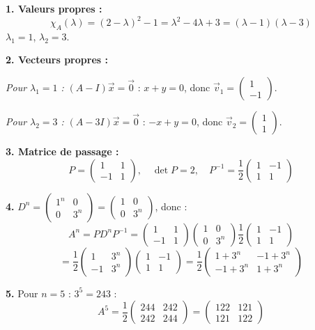\documentclass[12pt,a4paper]{article}
\begin{document}
\begin{boitecorrige}
\textbf{1. Valeurs propres :}
\[
\chi_A(\lambda) = (2-\lambda)^2 - 1 = \lambda^2 - 4\lambda + 3 = (\lambda-1)(\lambda-3)
\]
$\lambda_1 = 1$, $\lambda_2 = 3$.

\textbf{2. Vecteurs propres :}

\textit{Pour $\lambda_1 = 1$ :} $(A-I)\vec{x}=\vec{0}$ : $x+y=0$, donc $\vec{v}_1 = \begin{pmatrix}1\\-1\end{pmatrix}$.

\textit{Pour $\lambda_2 = 3$ :} $(A-3I)\vec{x}=\vec{0}$ : $-x+y=0$, donc $\vec{v}_2 = \begin{pmatrix}1\\1\end{pmatrix}$.

\textbf{3. Matrice de passage :}
\[
P = \begin{pmatrix}1&1\\-1&1\end{pmatrix}, \quad \det P = 2, \quad P^{-1} = \frac{1}{2}\begin{pmatrix}1&-1\\1&1\end{pmatrix}
\]

\textbf{4.} $D^n = \begin{pmatrix}1^n&0\\0&3^n\end{pmatrix} = \begin{pmatrix}1&0\\0&3^n\end{pmatrix}$, donc :
\[
A^n = PD^nP^{-1} = \begin{pmatrix}1&1\\-1&1\end{pmatrix}\begin{pmatrix}1&0\\0&3^n\end{pmatrix}\frac{1}{2}\begin{pmatrix}1&-1\\1&1\end{pmatrix}
\]
\[
= \frac{1}{2}\begin{pmatrix}1&3^n\\-1&3^n\end{pmatrix}\begin{pmatrix}1&-1\\1&1\end{pmatrix}
= \frac{1}{2}\begin{pmatrix}1+3^n & -1+3^n \\ -1+3^n & 1+3^n\end{pmatrix}
\]

\textbf{5.} Pour $n=5$ : $3^5 = 243$ :
\[
A^5 = \frac{1}{2}\begin{pmatrix}244 & 242 \\ 242 & 244\end{pmatrix} = \begin{pmatrix}122 & 121 \\ 121 & 122\end{pmatrix}
\]
\end{boitecorrige}
\end{document}
